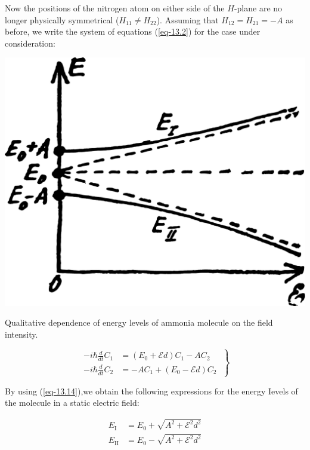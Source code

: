 \documentclass[a4paper,sfsidenotes,colorlinks=true]{tufte-book}
\numberwithin{equation}{section}
\numberwithin{figure}{section}
\newcommand{\Ea}{\mathcal{E}}
\begin{document}
Now the positions of the nitrogen atom on either side of the $H$-plane
are no longer physically symmetrical ($H_{11} \ne H_{22}$). Assuming
that $H_{12} =H_{21} = - A$ as before, we write the system of
equations (\ref{eq-13.2}) for the case under consideration:
\begin{marginfigure}%
\centering
\includegraphics[width=\textwidth]{figures/fig-13-02.pdf}
\caption{Qualitative dependence of energy levels of ammonia molecule
  on the field intensity.}
\label{fig-13.2}
\end{marginfigure}

\begin{equation}%
\left.
\begin{split}
-i \hbar \frac{d}{dt} C_{1} & = (E_{0} + \Ea d )C_{1} - AC_{2}\\
-i \hbar \frac{d}{dt} C_{2} & = - AC_{1} + (E_{0} - \Ea d )C_{2}
\end{split}
\; \right\}
\label{eq-13.18}
\end{equation}

By using (\ref{eq-13.14}),we obtain the following expressions for the energy
Ievels of the molecule in a static electric field:

\begin{equation}%
\begin{split}
E_{\mathrm{I}} & = E_{0} + \sqrt{A^{2} + \Ea^{2} d^{2}} \\
E_{\mathrm{II}} & = E_{0} - \sqrt{A^{2} + \Ea^{2} d^{2}} 
\end{split}
\label{eq-13.19}
\end{equation}
\end{document}
